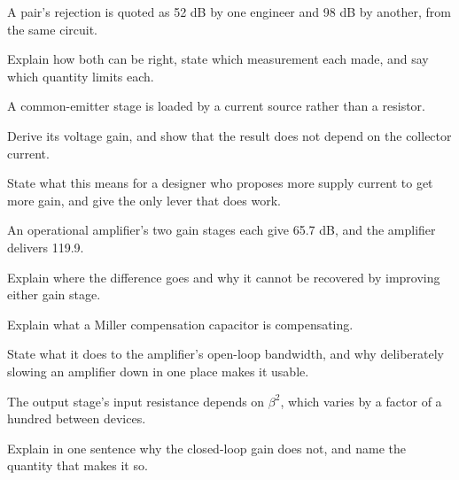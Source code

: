  A pair's rejection is quoted as 52 dB by one engineer and 98 dB by another, from the same circuit.

Explain how both can be right, state which measurement each made, and say which quantity limits each.

\label{exb:q:10}

 A common-emitter stage is loaded by a current source rather than a resistor.

Derive its voltage gain, and show that the result does not depend on the collector current.

State what this means for a designer who proposes more supply current to get more gain, and give the only lever that does work.

 An operational amplifier's two gain stages each give 65.7 dB, and the amplifier delivers 119.9.

Explain where the difference goes and why it cannot be recovered by improving either gain stage.

 Explain what a Miller compensation capacitor is compensating.

State what it does to the amplifier's open-loop bandwidth, and why deliberately slowing an amplifier down in one place makes it usable.

 The output stage's input resistance depends on $\beta^2$, which varies by a factor of a hundred between devices.

Explain in one sentence why the closed-loop gain does not, and name the quantity that makes it so.
